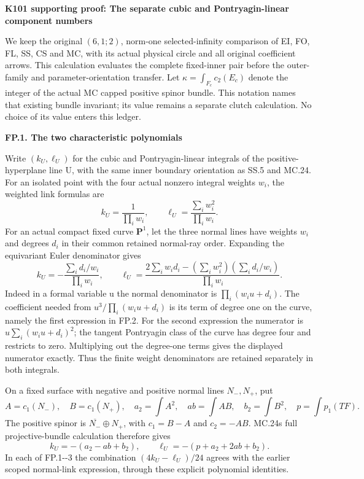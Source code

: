 \par\bigskip\noindent\textbf{K101 supporting proof: The separate cubic and Pontryagin-linear component numbers}\par\nobreak
We keep the original \((6,1;2)\), norm-one selected-infinity
comparison of EI, FO, FL, SS, CS and MC, with its actual physical
circle and all original coefficient arrows. This calculation
evaluates the complete fixed-inner pair before the outer-family
and parameter-orientation transfer. Let
\(\kappa=\int_{F_c}c_2(E_c)\) denote the integer of the actual
MC capped positive spinor bundle. This notation names that
existing bundle invariant; its value remains a separate clutch
calculation. No choice of its value enters this ledger.

\par

\medskip\noindent\textbf{FP.1. The two characteristic polynomials}

\par\nobreak

Write \((k_U,\ell_U)\) for the cubic and Pontryagin-linear
integrals of the positive-hyperplane line U, with the same
inner boundary orientation as SS.5 and MC.24. For an isolated
point with the four actual nonzero integral weights \(w_i\),
the weighted link formulas are
\[
 k_U=\frac1{\prod_iw_i},\qquad
 \ell_U=\frac{\sum_iw_i^2}{\prod_iw_i}.                 \tag{FP.1}
\]
For an actual compact fixed curve \(\mathbf P^1\), let the
three normal lines have weights \(w_i\) and degrees \(d_i\)
in their common retained normal-ray order. Expanding the
equivariant Euler denominator gives
\[
 k_U=-\frac{\sum_i d_i/w_i}{\prod_iw_i},\qquad
 \ell_U=\frac{2\sum_iw_id_i-
                   (\sum_iw_i^2)(\sum_i d_i/w_i)}{\prod_iw_i}.
                                                        \tag{FP.2}
\]
Indeed in a formal variable u the normal denominator is
\(\prod_i(w_iu+d_i)\). The coefficient needed from
\(u^3/\prod_i(w_iu+d_i)\) is its term of degree one on
the curve, namely the first expression in FP.2. For
the second expression the numerator is
\(u\sum_i(w_iu+d_i)^2\); the tangent Pontryagin class
of the curve has degree four and restricts to zero.
Multiplying out the degree-one terms gives the displayed
numerator exactly. Thus the finite weight denominators
are retained separately in both integrals.

On a fixed surface with negative and positive normal
lines \(N_-,N_+\), put
\[
 A=c_1(N_-),\quad B=c_1(N_+),\quad
 a_2=\int A^2,\quad a b=\int AB,\quad b_2=\int B^2,
 \quad p=\int p_1(TF).
\]
The positive spinor is \(\overline{N_-}\oplus N_+\),
with \(c_1=B-A\) and \(c_2=-AB\). MC.24\textquotesingle s full
projective-bundle calculation therefore gives
\[
 k_U=-(a_2-a b+b_2),\qquad
 \ell_U=-(p+a_2+2a b+b_2).                             \tag{FP.3}
\]
In each of FP.1-\/-3 the combination
\((4k_U-\ell_U)/24\) agrees with the earlier scoped
normal-link expression, through these explicit
polynomial identities.

